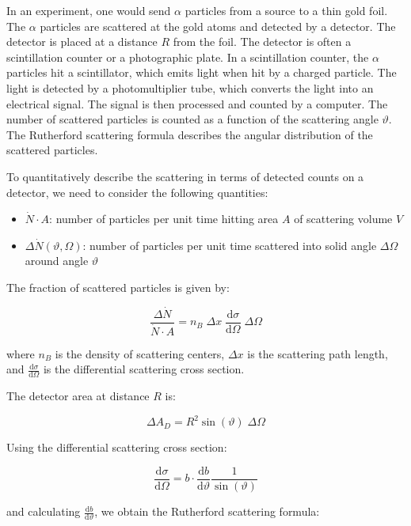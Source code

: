 \documentclass[
  a4paper,
]{book}
\providecommand{\tightlist}{%
  \setlength{\itemsep}{0pt}\setlength{\parskip}{0pt}}
\begin{document}
In an experiment, one would send \(\alpha\) particles from a source to a
thin gold foil. The \(\alpha\) particles are scattered at the gold atoms
and detected by a detector. The detector is placed at a distance \(R\)
from the foil. The detector is often a scintillation counter or a
photographic plate. In a scintillation counter, the \(\alpha\) particles
hit a scintillator, which emits light when hit by a charged particle.
The light is detected by a photomultiplier tube, which converts the
light into an electrical signal. The signal is then processed and
counted by a computer. The number of scattered particles is counted as a
function of the scattering angle \(\vartheta\). The Rutherford
scattering formula describes the angular distribution of the scattered
particles.

To quantitatively describe the scattering in terms of detected counts on
a detector, we need to consider the following quantities:

\begin{itemize}
\tightlist
\item
  \(\dot{N} \cdot A\): number of particles per unit time hitting area
  \(A\) of scattering volume \(V\)
\item
  \(\Delta \dot{N}(\vartheta, \Omega)\): number of particles per unit
  time scattered into solid angle \(\Delta \Omega\) around angle
  \(\vartheta\)
\end{itemize}

The fraction of scattered particles is given by:

\[
\frac{\Delta \dot{N}}{\dot{N} \cdot A} = n_B \; \Delta x \; \frac{\mathrm{d} \sigma}{\mathrm{d} \Omega} \; \Delta \Omega
\]

where \(n_B\) is the density of scattering centers, \(\Delta x\) is the
scattering path length, and
\(\frac{\mathrm{d} \sigma}{\mathrm{d} \Omega}\) is the differential
scattering cross section.

The detector area at distance \(R\) is:

\[
\Delta A_D = R^2 \sin \left( \vartheta \right) \; \Delta \Omega
\]

Using the differential scattering cross section:

\[
\frac{\mathrm{d}\sigma}{\mathrm{d}\Omega} = b \cdot \frac{\mathrm{d}b}{\mathrm{d}\vartheta}  \frac{1}{\sin \left( \vartheta \right)}
\]

and calculating \(\frac{\mathrm{d}b}{\mathrm{d}\vartheta}\), we obtain
the Rutherford scattering formula:
\end{document}
